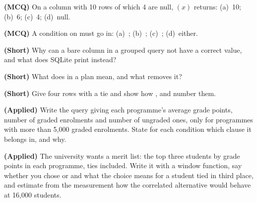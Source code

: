 \begin{reviewq}
  \item \textbf{(MCQ)} On a column with 10 rows of which 4 are null,
        $(x)$ returns: (a)~10; (b)~6; (c)~4; (d)~null.
  \item \textbf{(MCQ)} A condition on  must go in:
        (a)~; (b)~; (c)~;
        (d)~either.
  \item \textbf{(Short)} Why can a bare column in a grouped query not have a
        correct value, and what does SQLite print instead?
  \item \textbf{(Short)} What does  in a plan
        mean, and what removes it?
  \item \textbf{(Short)} Give four rows with a tie and show how
        ,  and  number them.
  \item \textbf{(Applied)} Write the query giving each programme's average
        grade points, number of graded enrolments and number of ungraded ones,
        only for programmes with more than 5{,}000 graded enrolments. State
        for each condition which clause it belongs in, and why.
  \item \textbf{(Applied)} The university wants a merit list: the top three
        students by grade points in each programme, ties included. Write it
        with a window function, say whether you chose  or
         and what the choice means for a student tied in
        third place, and estimate from the measurement how the correlated
        alternative would behave at 16{,}000 students.
\end{reviewq}

